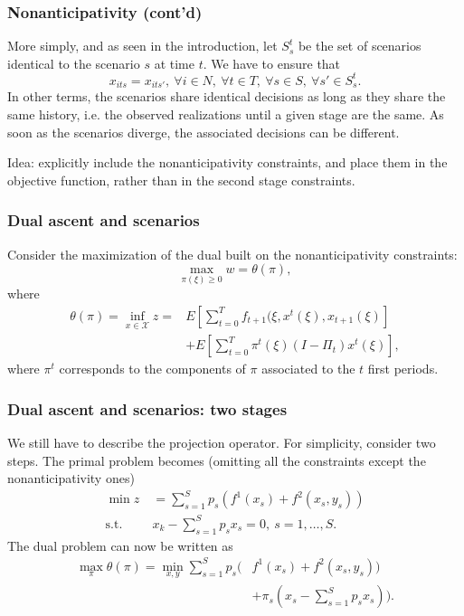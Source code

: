 \documentclass[french]{beamer}
\begin{document}
\begin{frame}
\frametitle{Nonanticipativity (cont'd)}

More simply, and as seen in the introduction, let $S_s^t$ be the set of scenarios identical to the  scenario $s$ at time $t$.
We have to ensure that
\[
x_{its} = x_{its'},\ \forall i \in N,\ \forall t \in T,\ \forall s \in
S,\ \forall s' \in S_s^t.
\]
In other terms, the scenarios share identical decisions as long as they share the same history, i.e. the observed realizations until a given stage are the same.
As soon as the scenarios diverge, the associated decisions can be different.

\mbox{}

{\red Idea}: explicitly include the nonanticipativity constraints, and place them in the objective function, rather than in the second stage constraints.

\end{frame}

\begin{frame}
\frametitle{Dual ascent and scenarios}

Consider the maximization of the dual built on the nonanticipativity constraints:
\[
\max_{\pi(\xi) \geq 0} w = \theta(\pi),
\]
where
\begin{align*}
\theta(\pi) = \inf_{x \in \mathcal{X}} z = & 
E\left[\sum_{t = 0}^T f_{t+1} (\xi, x^t(\xi), x_{t+1}(\xi) \right] \\
& + E\left[\sum_{t = 0}^T \pi^t(\xi)(I-\Pi_t)x^t(\xi) \right],
\end{align*}
where $\pi^t$ corresponds to the components of $\pi$ associated to the $t$ first periods.

\end{frame}

\begin{frame}
\frametitle{Dual ascent and scenarios: two stages}

We still have to describe the projection operator.
For simplicity, consider two steps.
The primal problem becomes (omitting all the constraints except the nonanticipativity ones)
\begin{align*}
\min z\ & = \sum_{s = 1}^S p_s \left( f^1(x_s)+f^2(x_s, y_s) \right) \\
\mbox{s.t. } & x_k - \sum_{s=1}^S p_s x_s = 0,\ s=1,\ldots,S. 
\end{align*}
The dual problem can now be written as
\begin{align*}
\max_{\pi} \theta(\pi) = \min_{x,y} \sum_{s=1}^S p_s\Biggl(& f^1(x_s)+f^2(x_s,
y_s))\\
& + \pi_s\left( x_s - \sum_{s=1}^S p_sx_s \right) \Biggr).
\end{align*}

\end{frame}
\end{document}
